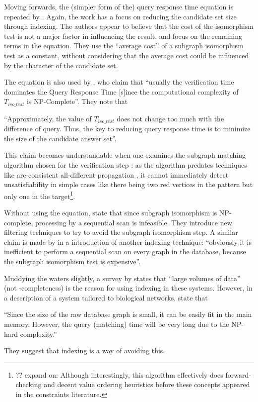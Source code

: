 \documentclass[twoside,11pt]{article}
\newcommand{\citet}[1]{\citeA{#1}}
\newcommand{\citep}[1]{\cite{#1}}
\begin{document}
Moving forwards, the (simpler form of the) query response time equation is repeated by
\citet{DBLP:conf/vldb/ZhaoYY07}. Again, the work has a focus on reducing the candidate set size
through indexing. The authors appear to believe that the cost of the isomorphism test is not a major
factor in influencing the result, and focus on the remaining terms in the equation. They use the
``average cost'' of a subgraph isomorphism test as a constant, without considering that the average
cost could be influenced by the character of the candidate set.

The equation is also used by \citet{DBLP:conf/icde/JiangWYZ07}, who claim that ``usually the
verification time dominates the Query Response Time [s]ince the computational complexity of
$T_{\mathit{iso\_test}}$ is NP-Complete''. They note that \begin{displayquote}``Approximately, the
    value of $T_{\mathit{iso\_test}}$ does not change too much with the difference of query. Thus,
the key to reducing query response time is to minimize the size of the candidate answer
set''.\end{displayquote} This claim becomes understandable when one examines the subgraph matching
algorithm chosen for the verification step \citep{DBLP:journals/jacm/Ullmann76}: as the algorithm
predates techniques like arc-consistent all-different propagation \citep{DBLP:conf/aaai/Regin94}, it
cannot immediately detect unsatisfiability in simple cases like there being two red vertices in the
pattern but only one in the target\footnote{?? expand on: Although interestingly, this algorithm
effectively does forward-checking and decent value ordering heuristics before these concepts
appeared in the constraints literature.}.

Without using the equation, \citet{DBLP:conf/sigmod/ChengKNL07} state that since subgraph
isomorphism is NP-complete, processing by a sequential scan is infeasible. They introduce new
filtering techniques to try to avoid the subgraph isomorphism step. A similar claim is made by
\citet{DBLP:conf/icde/ZhangHY07} in a introduction of another indexing technique: ``obviously it is
inefficient to perform a sequential scan on every graph in the database, because the subgraph
isomorphism test is expensive''.

Muddying the waters slightly, a survey by \citet{DBLP:journals/datamine/HanCXY07} states that
``large volumes of data'' (not \NP-completeness) is the reason for using indexing in these systems.
However, in a description of a system tailored to biological networks,
\citet{DBLP:conf/edbt/ZhangLY09} state that \begin{displayquote}``Since the size of the raw database
    graph is small, it can be easily fit in the main memory.  However, the query (matching) time
will be very long due to the NP-hard complexity.''\end{displayquote} They suggest that indexing is
a way of avoiding this.
\end{document}
